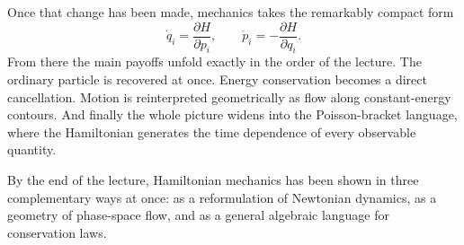 Once that change has been made, mechanics takes the remarkably compact form
\begin{equation}
\dot q_i=\frac{\partial H}{\partial p_i},
\qquad
\dot p_i=-\frac{\partial H}{\partial q_i}.
\end{equation}
From there the main payoffs unfold exactly in the order of the lecture. The ordinary particle is recovered at once. Energy conservation becomes a direct cancellation. Motion is reinterpreted geometrically as flow along constant-energy contours. And finally the whole picture widens into the Poisson-bracket language, where the Hamiltonian generates the time dependence of every observable quantity.

By the end of the lecture, Hamiltonian mechanics has been shown in three complementary ways at once: as a reformulation of Newtonian dynamics, as a geometry of phase-space flow, and as a general algebraic language for conservation laws.